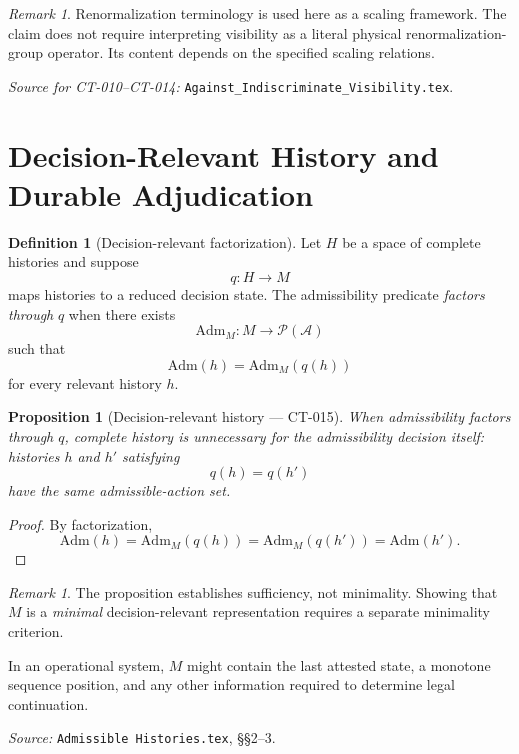 \documentclass[11pt]{article}
\newtheorem{proposition}[theorem]{Proposition}
\theoremstyle{definition}
\newtheorem{definition}[theorem]{Definition}
\theoremstyle{remark}
\newtheorem{remark}[theorem]{Remark}
\newcommand{\acts}{\mathcal{A}}
\newcommand{\admissible}{\mathrm{Adm}}
\begin{document}
\begin{remark}
Renormalization terminology is used here as a scaling framework. The claim
does not require interpreting visibility as a literal physical
renormalization-group operator. Its content depends on the specified scaling
relations.
\end{remark}

\noindent\emph{Source for CT-010--CT-014:}
\texttt{Against\_Indiscriminate\_Visibility.tex}.

\section{Decision-Relevant History and Durable Adjudication}

\begin{definition}[Decision-relevant factorization]
Let $H$ be a space of complete histories and suppose
\[
  q:H\to M
\]
maps histories to a reduced decision state. The admissibility predicate
\emph{factors through} $q$ when there exists
\[
  \admissible_M:M\to\mathcal{P}(\acts)
\]
such that
\[
  \admissible(h)
  =
  \admissible_M(q(h))
\]
for every relevant history $h$.
\end{definition}

\begin{proposition}[Decision-relevant history --- CT-015]
When admissibility factors through $q$, complete history is unnecessary for
the admissibility decision itself: histories $h$ and $h'$ satisfying
\[
  q(h)=q(h')
\]
have the same admissible-action set.
\end{proposition}

\begin{proof}
By factorization,
\[
  \admissible(h)
  =
  \admissible_M(q(h))
  =
  \admissible_M(q(h'))
  =
  \admissible(h').
\]
\end{proof}

\begin{remark}
The proposition establishes sufficiency, not minimality. Showing that $M$ is
a \emph{minimal} decision-relevant representation requires a separate
minimality criterion.

In an operational system, $M$ might contain the last attested state, a
monotone sequence position, and any other information required to determine
legal continuation.
\end{remark}

\noindent\emph{Source:} \texttt{Admissible Histories.tex}, \S\S2--3.
\end{document}
